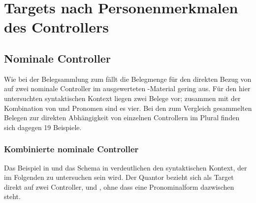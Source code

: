
\section{Targets nach Personenmerkmalen des Controllers}
\label{sec:kctargpers}

\subsection{Nominale Controller}

Wie bei der Belegsammlung zum \CAO{} fällt die Belegmenge für den
direkten Bezug von  auf zwei nominale Controller im ausgewerteten
\KC{}-Material gering aus. Für den hier untersuchten syntaktischen Kontext
liegen zwei Belege vor; zusammen mit der Kombination von  und
Pronomen sind es vier. Bei den zum Vergleich gesammelten Belegen zur direkten
Abhängigkeit von einzelnen Controllern im Plural finden sich dagegen 19
Beispiele.

\subsubsection{Kombinierte nominale Controller}
\label{subsubsec:conomctrlpers}

Das Beispiel in  und das Schema in 
verdeutlichen den syntaktischen Kontext, der im Folgenden zu untersuchen sein
wird. Der Quantor  bezieht sich als Target direkt auf zwei
Controller,  und , ohne dass eine Pronominalform
dazwischen steht.

\begin{exe}
\end{exe}

